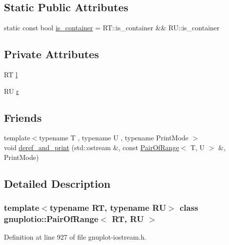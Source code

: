 \subsection*{Static Public Attributes}
\begin{DoxyCompactItemize}
\item 
static const bool \hyperlink{classgnuplotio_1_1_pair_of_range_ab49c6567f0fa6a82fa2a6245fd964659}{is\+\_\+container} = R\+T\+::is\+\_\+container \&\& R\+U\+::is\+\_\+container
\end{DoxyCompactItemize}
\subsection*{Private Attributes}
\begin{DoxyCompactItemize}
\item 
RT \hyperlink{classgnuplotio_1_1_pair_of_range_ac3c197aa24c55c214cbab37ecc17635e}{l}
\item 
RU \hyperlink{classgnuplotio_1_1_pair_of_range_a7c96877f553ed746e4b8d80e5ca0965e}{r}
\end{DoxyCompactItemize}
\subsection*{Friends}
\begin{DoxyCompactItemize}
\item 
{\footnotesize template$<$typename T , typename U , typename Print\+Mode $>$ }\\void \hyperlink{classgnuplotio_1_1_pair_of_range_aada62f803432f04aff66f3c609329520}{deref\+\_\+and\+\_\+print} (std\+::ostream \&, const \hyperlink{classgnuplotio_1_1_pair_of_range}{Pair\+Of\+Range}$<$ T, U $>$ \&, Print\+Mode)
\end{DoxyCompactItemize}


\subsection{Detailed Description}
\subsubsection*{template$<$typename RT, typename RU$>$\newline
class gnuplotio\+::\+Pair\+Of\+Range$<$ R\+T, R\+U $>$}



Definition at line 927 of file gnuplot-\/iostream.\+h.



